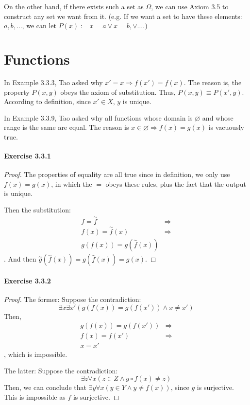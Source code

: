 On the other hand, if there exists such a set as $\Omega$, we can use Axiom 3.5 to construct any set 
we want from it. (e.g. If we want a set to have these elements: $a,b,\dots$, we can let 
$P(x):= x = a \vee x = b, \vee \dots$.)

\section{Functions}
In Example 3.3.3, Tao asked why $x'=x \Rightarrow f(x')=f(x)$. The reason is, the property $P(x,y)$ 
obeys the axiom of substitution. Thus, $P(x,y)\equiv P(x',y)$. According to definition, since 
$x' \in X$, $y$ is unique.

In Example 3.3.9, Tao asked why all functions whose domain is $\varnothing$ and whose range is the same 
are equal. The reason is $x \in \varnothing \Longrightarrow f(x) = g(x)$ is vacuously true.

\paragraph{Exercise 3.3.1} \label{exercise3.3.1}
\begin{proof}
The properties of equality are all true since in definition, we only use $f(x) = g(x)$, in which the $=$ 
obeys these rules, plus the fact that the output is unique.

Then the substitution:
\begin{align*}
f = \overset{\sim}{f} &\Longrightarrow \\
f(x) = \overset{\sim}{f}(x) &\Longrightarrow \\
g(f(x)) = g(\overset{\sim}{f}(x))
\end{align*}. 
And then $\overset{\sim}{g}(\overset{\sim}{f}(x)) = g(\overset{\sim}{f}(x)) = g(x)$.
\end{proof}

\paragraph{Exercise 3.3.2} \label{exercise3.3.2}
\begin{proof}
The former: Suppose the contradiction:
\[
\exists x \exists x'(g(f(x)) = g(f(x')) \wedge x \neq x')
\]
Then, 
\begin{align*}
g(f(x)) = g(f(x')) &\Longrightarrow \\
f(x)= f(x') \tag{$g$ is injective} &\Longrightarrow \\
x = x' \tag{$f$ is injective}
\end{align*}, 
which is impossible.

The latter: Suppose the contradiction:
\[
\exists z \forall x(z \in Z \wedge g \circ f(x) \neq z) 
\]
Then, we can conclude that $\exists y \forall x(y \in Y \wedge y \neq f(x))$, since $g$ is surjective. 
This is impossible as $f$ is surjective.
\end{proof}

